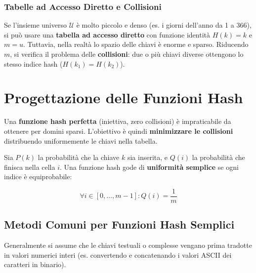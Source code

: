 \documentclass[12pt, a4paper]{article}
\begin{document}
\subsubsection{Tabelle ad Accesso Diretto e Collisioni}
Se l'insieme universo $\mathcal{U}$ è molto piccolo e denso (es. i giorni dell'anno da 1 a 366), si può usare una \textbf{tabella ad accesso diretto} con funzione identità $H(k) = k$ e $m = u$.
Tuttavia, nella realtà lo spazio delle chiavi è enorme e sparso. Riducendo $m$, si verifica il problema delle \textbf{collisioni}: due o più chiavi diverse ottengono lo stesso indice hash ($H(k_1) = H(k_2)$).

\newpage

\section{Progettazione delle Funzioni Hash}

Una \textbf{funzione hash perfetta} (iniettiva, zero collisioni) è impraticabile da ottenere per domini sparsi. L'obiettivo è quindi \textbf{minimizzare le collisioni} distribuendo uniformemente le chiavi nella tabella.

\begin{tcolorbox}[colback=lightergray!10, colframe=tocsec, title=\textbf{Uniformità Semplice}]
Sia $P(k)$ la probabilità che la chiave $k$ sia inserita, e $Q(i)$ la probabilità che finisca nella cella $i$.
Una funzione hash gode di \textbf{uniformità semplice} se ogni indice è equiprobabile:


$$\forall i \in [0, \dots, m-1] : Q(i) = \frac{1}{m}$$


\end{tcolorbox}

\subsection{Metodi Comuni per Funzioni Hash Semplici}
Generalmente si assume che le chiavi testuali o complesse vengano prima tradotte in valori numerici interi (es. convertendo e concatenando i valori ASCII dei caratteri in binario).
\end{document}

